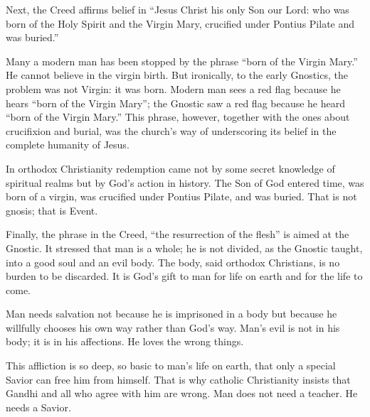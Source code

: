 Next, the Creed affirms belief in “Jesus Christ his only Son our Lord: who was born of the Holy
Spirit and the Virgin Mary, crucified under Pontius Pilate and was buried.”

Many a modern man has been stopped by the phrase “born of the Virgin Mary.” He cannot believe in the
virgin birth. But ironically, to the early Gnostics, the problem was not Virgin: it was born. Modern
man sees a red flag because he hears “born of the Virgin Mary”; the Gnostic saw a red flag because
he heard “born of the Virgin Mary.” This phrase, however, together with the ones about crucifixion
and burial, was the church’s way of underscoring its belief in the complete humanity of Jesus.

In orthodox Christianity redemption came not by some secret knowledge of spiritual realms but by
God’s action in history. The Son of God entered time, was born of a virgin, was crucified under
Pontius Pilate, and was buried. That is not gnosis; that is Event.

Finally, the phrase in the Creed, “the resurrection of the flesh” is aimed at the Gnostic. It
stressed that man is a whole; he is not divided, as the Gnostic taught, into a good soul and an evil
body. The body, said orthodox Christians, is no burden to be discarded. It is God’s gift to man for
life on earth and for the life to come.

Man needs salvation not because he is imprisoned in a body but because he willfully chooses his own
way rather than God’s way. Man’s evil is not in his body; it is in his affections. He loves the
wrong things.

This affliction is so deep, so basic to man’s life on earth, that only a special Savior can free him
from himself. That is why catholic Christianity insists that Gandhi and all who agree with him are
wrong. Man does not need a teacher. He needs a Savior.

